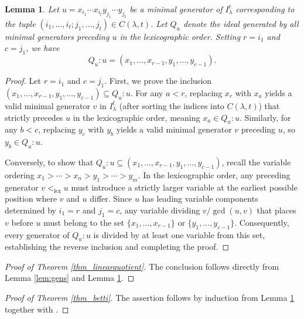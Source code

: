 \documentclass[12pt,amscd]{amsart}
\newtheorem{lem}[thm]{Lemma}
\theoremstyle{definition}
\numberwithin{equation}{section}
\begin{document}
\begin{lem}\label{lem_linearquotients} 
Let $u = x_{i_1} \cdots x_{i_t} y_{j_1} \cdots y_{j_t}$ be a minimal generator of $I_\lambda^t$ corresponding to the tuple $(i_1, \ldots, i_t; j_1, \ldots, j_t) \in C(\lambda,t)$. Let $Q_u$ denote the ideal generated by all minimal generators preceding $u$ in the lexicographic order. Setting $r = i_1$ and $c = j_1$, we have 
\[
Q_u : u = (x_1, \ldots, x_{r-1}, y_1, \ldots, y_{c-1}).
\]
\end{lem}

\begin{proof} 
Let $r = i_1$ and $c = j_1$. 
First, we prove the inclusion $(x_1, \ldots, x_{r-1}, y_1, \ldots, y_{c-1}) \subseteq Q_u : u$. 
For any $a < r$, replacing $x_r$ with $x_a$ yields a valid minimal generator $v$ in $I_\lambda^t$ (after sorting the indices into $C(\lambda,t)$) that strictly precedes $u$ in the lexicographic order, meaning $x_a \in Q_u : u$. 
Similarly, for any $b < c$, replacing $y_c$ with $y_b$ yields a valid minimal generator $v$ preceding $u$, so $y_b \in Q_u : u$. 

Conversely, to show that $Q_u : u \subseteq (x_1, \ldots, x_{r-1}, y_1, \ldots, y_{c-1})$, recall the variable ordering $x_1 > \cdots > x_n > y_1 > \cdots > y_m$. In the lexicographic order, any preceding generator $v <_{\text{lex}} u$ must introduce a strictly larger variable at the earliest possible position where $v$ and $u$ differ. Since $u$ has leading variable components determined by $i_1 = r$ and $j_1 = c$, any variable dividing $v / \gcd(u,v)$ that places $v$ before $u$ must belong to the set $\{x_1, \ldots, x_{r-1}\}$ or $\{y_1, \ldots, y_{c-1}\}$. Consequently, every generator of $Q_u : u$ is divided by at least one variable from this set, establishing the reverse inclusion and completing the proof.
\end{proof}

\begin{proof}[Proof of Theorem \ref{thm_linearquotient}] 
The conclusion follows directly from Lemma \ref{lem:gens} and Lemma \ref{lem_linearquotients}.    
\end{proof}

\begin{proof}[Proof of Theorem \ref{thm_betti}] 
The assertion follows by induction from Lemma \ref{lem_linearquotients} together with \cite[Theorem 2.6]{SV}.    
\end{proof}
\end{document}
